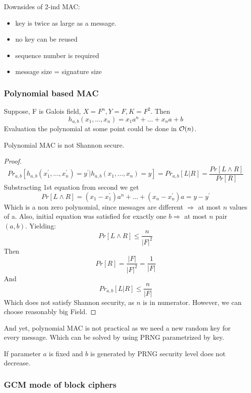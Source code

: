 Downsides of 2-ind MAC:
\begin{itemize}
	\item key is twice as large as a message.
	\item no key can be reused
	\item sequence number is required
	\item message size = signature size
\end{itemize}

\subsubsection{Polynomial based MAC}
Suppose, F is Galois field, $X = F^n, Y = F, K = F^2$. Then
\[ h_{a,b}(x_1,...,x_n) = x_1a^n + ... + x_na + b \]
Evaluation the polynomial at some point could be done in $\mathcal{O}(n)$.

\begin{theorem}
	Polynomial MAC is not Shannon secure.
\end{theorem}
\begin{proof}
\[ Pr_{a,b} [h_{a,b}(x_1^{\prime},...,x_n^{\prime}) = y^{\prime} | h_{a,b}(x_1,...,x_n) = y] = Pr_{a,b}[L | R] = \frac{Pr[L \land R]}{Pr[R]} \]
Substracting 1st equation from second we get
\[ Pr[L \land R] = (x_1 - x_1^{\prime})a^n + ... + (x_n - x_n^{\prime})a = y - y^{\prime} \]
Which is a non zero polynomial, since messages are different $\Rightarrow$ at most $n$ values of a.
Also, initial equation was satisfied for exactly one $b \Rightarrow$ at most $n$ pair $(a, b)$. Yielding:
\[ Pr[L \land R] \leq \frac{n}{|F|^2} \]
Then
\[ Pr[R] = \frac{|F|}{|F|^2} = \frac{1}{|F|} \]
And
\[ Pr_{a,b}[L | R] \leq \frac{n}{|F|} \]
Which does not satisfy Shannon security, as $n$ is in numerator. However, we can choose reasonably big Field.

\end{proof}

And yet, polynomial MAC is not practical as we need a new random key for every message.
Which can be solved by using PRNG parametrized by key.
\begin{observation}
	If parameter $a$ is fixed and $b$ is generated by PRNG security level does not decrease.
\end{observation}

\subsubsection{GCM mode of block ciphers}

